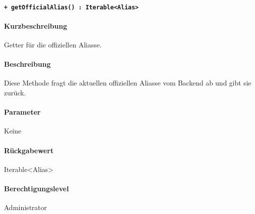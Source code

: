 \paragraph{\texttt{+ getOfficialAlias() : Iterable<Alias>}}%
\paragraph*{Kurzbeschreibung}
Getter für die offiziellen Aliasse.
\paragraph*{Beschreibung}
Diese Methode fragt die aktuellen offiziellen Aliasse vom Backend ab und gibt sie zurück.
\paragraph*{Parameter}
Keine
\paragraph*{Rückgabewert}
Iterable<Alias>
\paragraph*{Berechtigungslevel}
Administrator